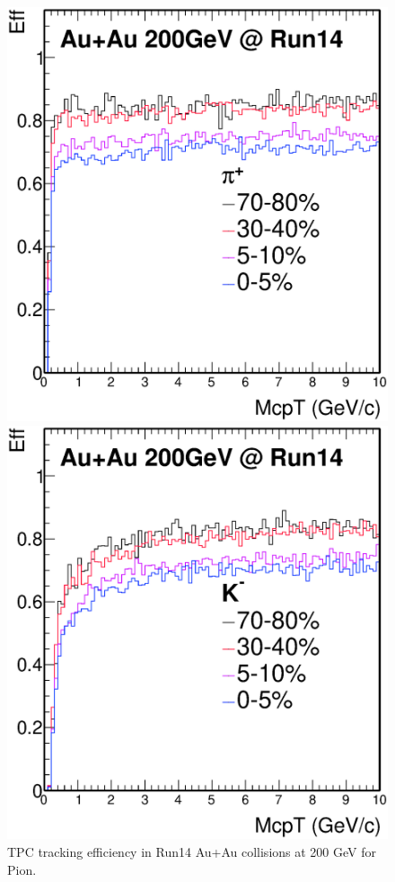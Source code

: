 \begin{figure}[htbp]
\begin{minipage}[htbp]{0.52\linewidth}
\centering
\includegraphics[width=1.0\textwidth]{figure/Run14_D0HFT/pion.eps}
\caption{TPC tracking efficiency in Run14 Au+Au collisions at 200 GeV for Pion. \label{fig:mpion}}
\end{minipage}
\hfill
\begin{minipage}[htbp]{0.52\linewidth}
\centering
\includegraphics[width=1.0\textwidth]{figure/Run14_D0HFT/kaon.eps} 

\end{minipage}
\end{figure}
